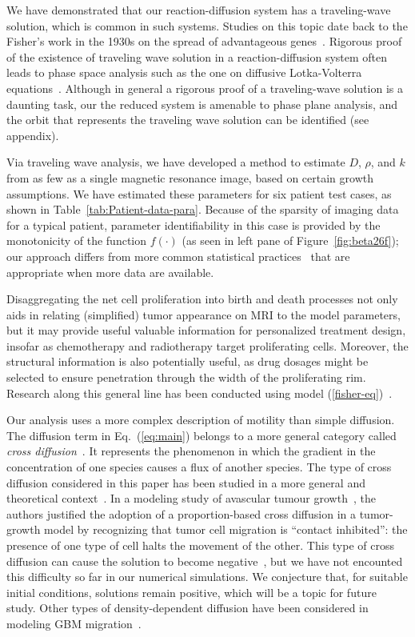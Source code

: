 \documentclass{aims}
\numberwithin{equation}{section}
\begin{document}
We have demonstrated that our reaction-diffusion system has a traveling-wave solution,
which is common in such systems.
Studies on this topic date back to the Fisher's work in the 1930s on the spread of
advantageous genes~\cite{Fisher1937}. Rigorous
proof of the existence of traveling wave solution in a reaction-diffusion
system often leads to phase space analysis such as the one on diffusive
Lotka-Volterra equations~\cite{Dunbar1983}.  Although in general a rigorous
proof of a traveling-wave solution is a daunting task, our 
the reduced system is amenable to phase plane analysis, and the orbit that represents
the traveling wave solution can be identified (see appendix).

Via traveling wave analysis, we have developed a method to estimate $D$, $\rho$, and
$k$ from as few as a single magnetic resonance image, based on certain growth
assumptions. We have estimated these parameters for six
patient test cases, as shown in Table~\ref{tab:Patient-data-para}. Because of the
sparsity of imaging data for a typical patient,
parameter identifiability in this case is provided
by the monotonicity of the function  $f(\cdot)$ (as seen in left pane of
Figure~\ref{fig:beta26f});  our approach differs from more common statistical
practices~\cite{Eisenberg2017} that are appropriate when more data are available. 
   
Disaggregating the net cell proliferation into birth and death processes not only
aids in relating (simplified) tumor appearance on MRI to the model parameters, but
it may provide useful valuable information for personalized treatment
design, insofar as chemotherapy and radiotherapy target proliferating cells.
Moreover, the structural information is also potentially useful, as drug dosages
might be selected to ensure penetration through the width
of the proliferating rim. Research along this general line has been conducted using
model (\ref{fisher-eq})~\cite{Kim2017}.

Our analysis uses a more complex description of motility than simple diffusion.
The diffusion term in Eq.~(\ref{eq:main}) belongs to a more general category called
\emph{cross diffusion}~\cite{Madzvamuse2017}.  It represents the phenomenon in which
the gradient in the concentration of one species causes a flux
of another species.  The type of cross diffusion considered in this paper has been
studied in a more general and theoretical context~\cite{Sherratt2000}.  In a
modeling study of avascular tumour growth~\cite{Sherratt2001b}, the authors justified
the adoption of a proportion-based cross diffusion in a tumor-growth model by recognizing
that tumor cell migration is ``contact inhibited'':  the presence
of one type of cell halts the movement of the other. This type of cross diffusion
can cause the solution to become negative~\cite{Madzvamuse2017}, but we have not
encounted this difficulty so far in our numerical simulations.
We conjecture that, for suitable initial conditions,
solutions remain positive, which will be a topic for future study. 
Other types of density-dependent
diffusion have been considered in modeling GBM migration~\cite{Stepien2015}.
\end{document}

